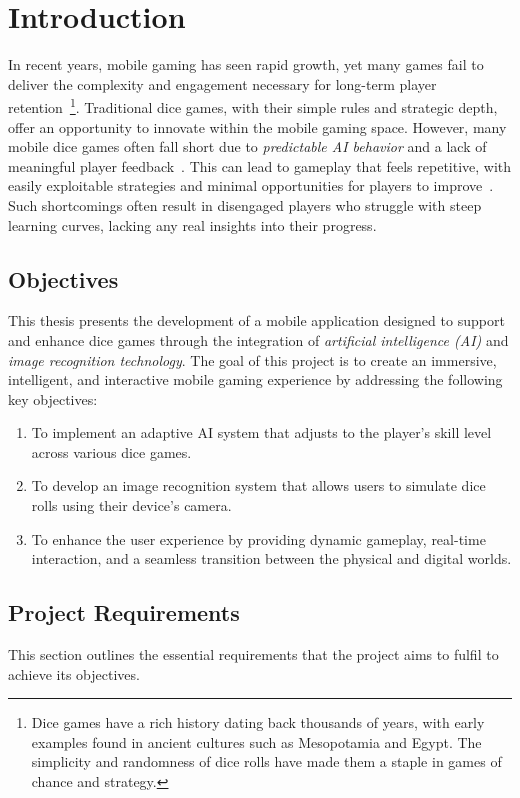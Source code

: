 
\chapter{Introduction}
\label{chap:introduction}

In recent years, mobile gaming has seen rapid growth, yet many games fail to deliver the complexity and engagement necessary for long-term player retention~\footnote{Dice games have a rich history dating back thousands of years, with early examples found in ancient cultures such as Mesopotamia and Egypt. The simplicity and randomness of dice rolls have made them a staple in games of chance and strategy.}. Traditional dice games, with their simple rules and strategic depth, offer an opportunity to innovate within the mobile gaming space. However, many mobile dice games often fall short due to \emph{predictable AI behavior} and a lack of meaningful player feedback~\cite{bib:appannie}. This can lead to gameplay that feels repetitive, with easily exploitable strategies and minimal opportunities for players to improve~\cite{bib:yannakakis}. Such shortcomings often result in disengaged players who struggle with steep learning curves, lacking any real insights into their progress.

\section{Objectives}
This thesis presents the development of a mobile application designed to support and enhance dice games through the integration of \emph{artificial intelligence (AI)} and \emph{image recognition technology}. The goal of this project is to create an immersive, intelligent, and interactive mobile gaming experience by addressing the following key objectives:
\begin{enumerate}
    \item To implement an adaptive AI system that adjusts to the player’s skill level across various dice games.
    \item To develop an image recognition system that allows users to simulate dice rolls using their device's camera.
    \item To enhance the user experience by providing dynamic gameplay, real-time interaction, and a seamless transition between the physical and digital worlds.
\end{enumerate}

\section{Project Requirements}
This section outlines the essential requirements that the project aims to fulfil to achieve its objectives.

